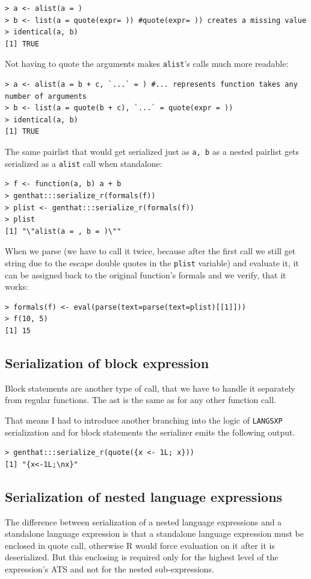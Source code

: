\documentclass[thesis=B,english]{FITthesis}[2012/10/20]
\begin{document}
\begin{verbatim}
> a <- alist(a = )
> b <- list(a = quote(expr= )) #quote(expr= )) creates a missing value
> identical(a, b)
[1] TRUE
\end{verbatim}

Not having to quote the arguments makes \verb|alist|’s calls much more readable:

\begin{verbatim}
> a <- alist(a = b + c, `...` = ) #... represents function takes any number of arguments
> b <- list(a = quote(b + c), `...` = quote(expr = ))
> identical(a, b)
[1] TRUE
\end{verbatim}
The same pairlist that would get serialized just as \verb|a, b| as a nested pairlist gets serialized as a \verb|alist| call when standalone:
\begin{verbatim}
> f <- function(a, b) a + b
> genthat:::serialize_r(formals(f))
> plist <- genthat:::serialize_r(formals(f))
> plist
[1] "\"alist(a = , b = )\""
\end{verbatim}

When we parse (we have to call it twice, because after the first call we still get string due to the escape double quotes in the \verb|plist| variable) and evaluate it, it can be assigned back to the original function’s formals and we verify, that it works:

\begin{verbatim}
> formals(f) <- eval(parse(text=parse(text=plist)[[1]]))
> f(10, 5)
[1] 15

\end{verbatim}

\subsection{Serialization of block expression}
Block statements are another type of call, that we have to handle it separately from regular functions. The ast is the same as for any other function call.

That means I had to introduce another branching into the logic of \verb|LANGSXP| serialization and for block statements the serializer emits the following output.

\begin{verbatim}
> genthat:::serialize_r(quote({x <- 1L; x}))
[1] "{x<-1L;\nx}"
\end{verbatim}

\subsection{Serialization of nested language expressions}
The difference between serialization of a nested language expressions and a standalone language expression is that a standalone language expression must be enclosed in quote call, otherwise R would force evaluation on it after it is deserialized. But this enclosing is required only for the highest level of the expression’s ATS and not for the nested sub-expressions. 
\end{document}
